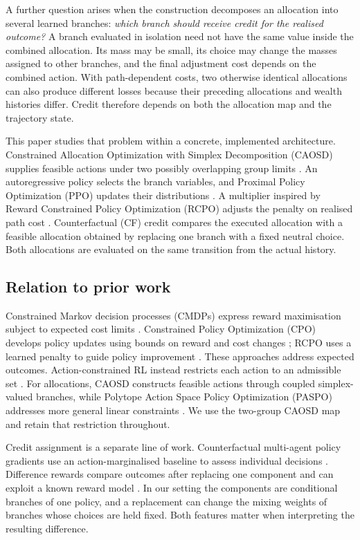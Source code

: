 \documentclass[10pt]{article}
\begin{document}
A further question arises when the construction decomposes an allocation into several learned branches: \emph{which branch should receive credit for the realised outcome?} A branch evaluated in isolation need not have the same value inside the combined allocation. Its mass may be small, its choice may change the masses assigned to other branches, and the final adjustment cost depends on the combined action. With path-dependent costs, two otherwise identical allocations can also produce different losses because their preceding allocations and wealth histories differ. Credit therefore depends on both the allocation map and the trajectory state.

This paper studies that problem within a concrete, implemented architecture. Constrained Allocation Optimization with Simplex Decomposition (CAOSD) supplies feasible actions under two possibly overlapping group limits \citep{winkel2023}. An autoregressive policy selects the branch variables, and Proximal Policy Optimization (PPO) updates their distributions \citep{schulman2017}. A multiplier inspired by Reward Constrained Policy Optimization (RCPO) adjusts the penalty on realised path cost \citep{tessler2019}. Counterfactual (CF) credit compares the executed allocation with a feasible allocation obtained by replacing one branch with a fixed neutral choice. Both allocations are evaluated on the same transition from the actual history.

\subsection{Relation to prior work}

Constrained Markov decision processes (CMDPs) express reward maximisation subject to expected cost limits \citep{kushwaha2025}. Constrained Policy Optimization (CPO) develops policy updates using bounds on reward and cost changes \citep{achiam2017}; RCPO uses a learned penalty to guide policy improvement \citep{tessler2019}. These approaches address expected outcomes. Action-constrained RL instead restricts each action to an admissible set \citep{lin2021}. For allocations, CAOSD constructs feasible actions through coupled simplex-valued branches, while Polytope Action Space Policy Optimization (PASPO) addresses more general linear constraints \citep{winkel2023,winkel2024paspo}. We use the two-group CAOSD map and retain that restriction throughout.

Credit assignment is a separate line of work. Counterfactual multi-agent policy gradients use an action-marginalised baseline to assess individual decisions \citep{foerster2018}. Difference rewards compare outcomes after replacing one component and can exploit a known reward model \citep{castellini2025}. In our setting the components are conditional branches of one policy, and a replacement can change the mixing weights of branches whose choices are held fixed. Both features matter when interpreting the resulting difference.
\end{document}
